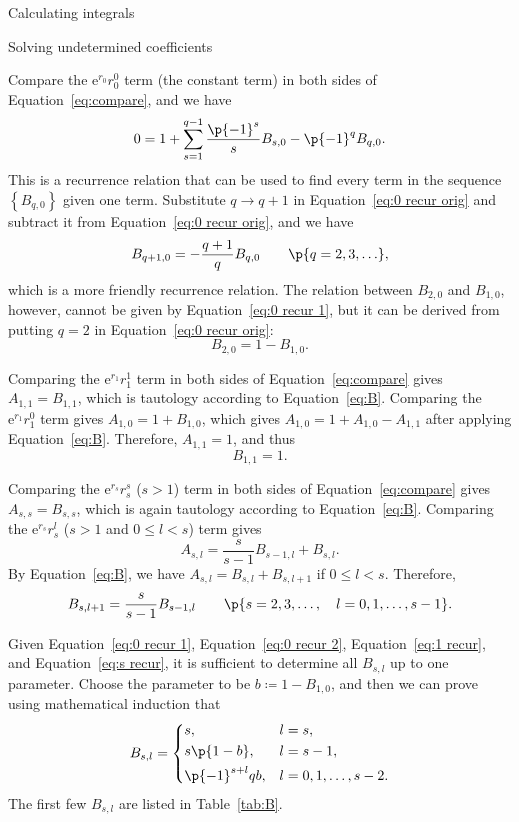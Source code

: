 \documentclass[oneside,12pt,final]{ucthesis-CA2012}
\newcommand{\mrm}[1]{\mathrm{#1}}
\newcommand{\ceq}{\coloneqq}
\newcommand{\e}{\mrm{e}}
\newcommand{\fr}{\frac}
\newcommand\B[1]{\left\{#1\right\}}
\begin{document}
\begin{mainmatter}
\begin{section}{Calculating integrals}
\end{section}
\begin{section}{Solving undetermined coefficients}
\label{sec:undetermined coef}

Compare the $\e^{r_0}r_0^0$ term (the constant term)
in both sides of Equation~\ref{eq:compare}, and we have
\begin{equation}
	\label{eq:0 recur orig}
	0=1+\sum_{s=1}^{q-1}\fr{\p{-1}^s}sB_{s,0}-\p{-1}^qB_{q,0}.
\end{equation}
This is a recurrence relation that can be used to find every term in the sequence $\B{B_{q,0}}$
given one term.
Substitute $q\to q+1$ in Equation~\ref{eq:0 recur orig}
and subtract it from Equation~\ref{eq:0 recur orig},
and we have
\begin{equation}
	\label{eq:0 recur 1}
	B_{q+1,0}=-\fr{q+1}qB_{q,0}\qquad\p{q=2,3,\ldots},
\end{equation}
which is a more friendly recurrence relation.
The relation between $B_{2,0}$ and $B_{1,0}$, however, cannot be given by
Equation~\ref{eq:0 recur 1},
but it can be derived from putting $q=2$ in Equation~\ref{eq:0 recur orig}:
\begin{equation}
	\label{eq:0 recur 2}
	B_{2,0}=1-B_{1,0}.
\end{equation}

Comparing the $\e^{r_1}r_1^1$ term in both sides of Equation~\ref{eq:compare}
gives $A_{1,1}=B_{1,1}$, which is tautology according to Equation~\ref{eq:B}.
Comparing the $\e^{r_1}r_1^0$ term gives $A_{1,0}=1+B_{1,0}$,
which gives $A_{1,0}=1+A_{1,0}-A_{1,1}$ after applying Equation~\ref{eq:B}.
Therefore, $A_{1,1}=1$, and thus
\begin{equation}
	\label{eq:1 recur}
	B_{1,1}=1.
\end{equation}

Comparing the $\e^{r_s}r_s^s$ ($s>1$) term in both sides of Equation~\ref{eq:compare}
gives $A_{s,s}=B_{s,s}$, which is again tautology according to Equation~\ref{eq:B}.
Comparing the $\e^{r_s}r_s^l$ ($s>1$ and $0\le l<s$) term gives
\[A_{s,l}=\fr s{s-1}B_{s-1,l}+B_{s,l}.\]
By Equation~\ref{eq:B}, we have $A_{s,l}=B_{s,l}+B_{s,l+1}$ if $0\le l<s$.
Therefore,
\begin{equation}
	\label{eq:s recur}
	B_{s,l+1}=\fr s{s-1}B_{s-1,l}\qquad\p{s=2,3,\ldots,\quad l=0,1,\ldots,s-1}.
\end{equation}

Given Equation~\ref{eq:0 recur 1}, Equation~\ref{eq:0 recur 2}, Equation~\ref{eq:1 recur},
and Equation~\ref{eq:s recur},
it is sufficient to determine all $B_{s,l}$ up to one parameter.
Choose the parameter to be $b\ceq1-B_{1,0}$,
and then we can prove using mathematical induction that
\begin{equation}
	\label{eq:B with b}
	B_{s,l}=\begin{dcases}
		s,&l=s,\\
		s\p{1-b},&l=s-1,\\
		\p{-1}^{s+l}qb,&l=0,1,\ldots,s-2.
	\end{dcases}
\end{equation}
The first few $B_{s,l}$ are listed in Table~\ref{tab:B}.


\end{section}
\end{mainmatter}
\end{document}
